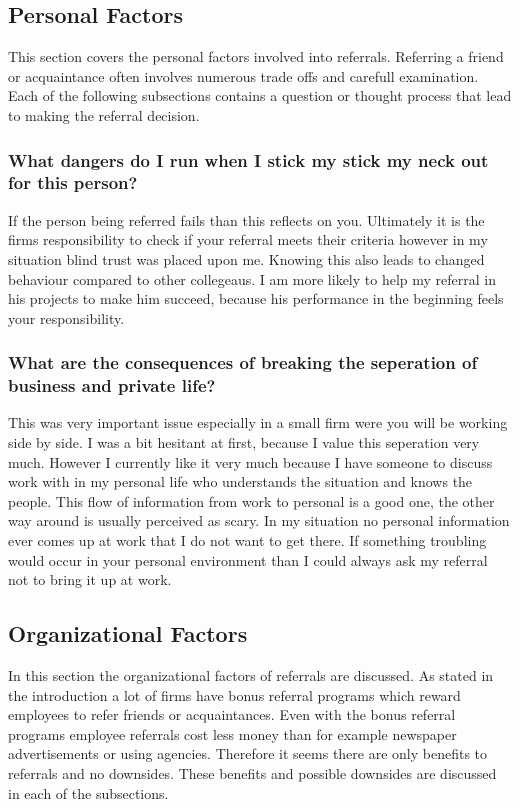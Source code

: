\documentclass[Main.tex]{subfiles}
\begin{document}
\subsection*{Personal Factors}

This section covers the personal factors involved into referrals. Referring a friend or acquaintance often involves numerous trade offs and carefull examination. Each of the following subsections contains a question or thought process that lead to making the referral decision.


\subsubsection*{What dangers do I run when I stick my stick my neck out for this person?}

If the person being referred fails than this reflects on you. Ultimately it is the firms responsibility to check if your referral meets their criteria however in my situation blind trust was placed upon me. Knowing this also leads to changed behaviour compared to other collegeaus. I am more likely to help my referral in his projects to make him succeed, because his performance in the beginning feels your responsibility.

\subsubsection*{What are the consequences of breaking the seperation of business and private life?}

This was very important issue especially in a small firm were you will be working side by side. I was a bit hesitant at first, because I value this seperation very much. However I currently like it very much because I have someone to discuss work with in my personal life who understands the situation and knows the people. This flow of information from work to personal is a good one, the other way around is usually perceived as scary. In my situation no personal information ever comes up at work that I do not want to get there. If something troubling would occur in your personal environment than I could always ask my referral not to bring it up at work. 

\subsection*{Organizational Factors}

In this section the organizational factors of referrals are discussed. As stated in the introduction a lot of firms have bonus referral programs which reward employees to refer friends or acquaintances. Even with the bonus referral programs employee referrals cost less money than for example newspaper advertisements or using agencies. Therefore it seems there are only benefits to referrals and no downsides. These benefits and possible downsides are discussed in each of the subsections.
\end{document}
